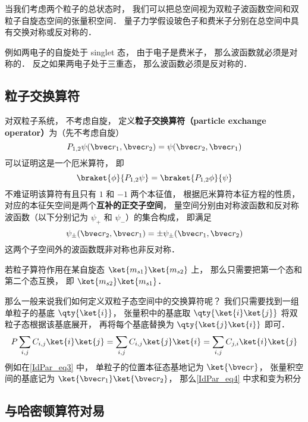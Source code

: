 当我们考虑两个粒子的总状态时， 我们可以把总空间视为双粒子波函数空间和双粒子自旋态空间的张量积空间． 量子力学假设玻色子和费米子分别在总空间中具有交换对称或反对称的．

例如两电子的自旋处于 singlet 态， 由于电子是费米子， 那么波函数就必须是对称的． 反之如果两电子处于三重态， 那么波函数必须是反对称的．

\subsection{粒子交换算符}

对双粒子系统， 不考虑自旋， 定义\textbf{粒子交换算符（particle exchange operator）}为（先不考虑自旋）
\begin{equation}\label{IdPar_eq3}
P_{1,2}\psi(\bvec r_1, \bvec r_2) = \psi(\bvec r_2, \bvec r_1)
\end{equation}
可以证明这是一个厄米算符， 即
\begin{equation}
\braket{\phi}{P_{1,2}\psi} = \braket{P_{1,2}\phi}{\psi}
\end{equation}
不难证明该算符有且只有 $1$ 和 $-1$ 两个本征值， 根据厄米算符本征方程的性质， 对应的本征矢空间是两个\textbf{互补的正交子空间}， 量空间分别由对称波函数和反对称波函数（以下分别记为 $\psi_+$ 和 $\psi_-$）的集合构成， 即满足
\begin{equation}
\psi_\pm(\bvec r_2, \bvec r_1) = \pm\psi_\pm(\bvec r_1, \bvec r_2)
\end{equation}
这两个子空间外的波函数既非对称也非反对称．

若粒子算符作用在某自旋态 $\ket{m_{s1}}\ket{m_{s2}}$ 上， 那么只需要把第一个态和第二个态互换， 即 $\ket{m_{s2}}\ket{m_{s1}}$．

那么一般来说我们如何定义双粒子态空间中的交换算符呢？ 我们只需要找到一组单粒子的基底 $\qty{\ket{i}}$， 张量积中的基底取 $\qty{\ket{i}\ket{j}}$ 将双粒子态根据该基底展开， 再将每个基底替换为 $\qty{\ket{j}\ket{i}}$ 即可．
\begin{equation}\label{IdPar_eq4}
P \sum_{i,j} C_{i,j} \ket{i}\ket{j} = \sum_{i,j} C_{i,j} \ket{j}\ket{i} = \sum_{i,j} C_{j,i} \ket{i}\ket{j}
\end{equation}
例如在\autoref{IdPar_eq3} 中， 单粒子的位置本征态基地记为 $\ket{\bvec r}$， 张量积空间的基底记为 $\ket{\bvec r_1}\ket{\bvec r_2}$， 那么\autoref{IdPar_eq4} 中求和变为积分

\subsection{与哈密顿算符对易}

